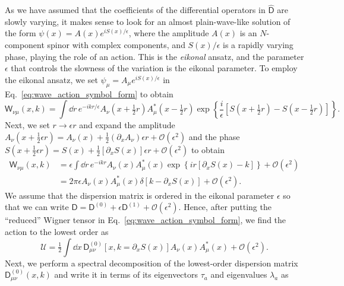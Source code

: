 As we have assumed that the coefficients of the differential operators in $\widehat{\mathsf{D}}$ are slowly varying, it makes sense to look for an almost plain-wave-like solution of the form
$\psi(x) = A(x)e^{iS(x)/\epsilon}$, where the amplitude $A(x)$ is an $N$-component spinor with complex components, and $S(x)/\epsilon$ is a rapidly varying phase, playing the role of an action.
This is the \emph{eikonal} ansatz, and the parameter $\epsilon$ that controls the slowness of the variation is the eikonal parameter.
To employ the eikonal ansatz, we set $\psi_{\mu} = A_{\mu}e^{iS(x)/\epsilon}$ in Eq.~\eqref{eq:wave_action_symbol_form} to obtain%
%
\begin{equation}
    \mathsf{W}_{\nu\mu}(x, k) = \int \dd{r}\,e^{-ikr/\epsilon} A_{\nu}\left(x + \tfrac{1}{2} r\right)A_{\mu}^{*}\left(x - \tfrac{1}{2} r\right)\exp\left\{\frac{i}{\epsilon}\left[S\left(x + \tfrac{1}{2} r\right) - S\left(x - \tfrac{1}{2} r\right)\right]\right\}.
\end{equation}
%
Next, we set $r \to \epsilon r$ and expand the amplitude $A_{\nu}(x + \tfrac{1}{2}\epsilon r) = A_{\nu}(x) + \tfrac{1}{2}(\partial_{x}A_{\nu})\epsilon r + \mathcal{O}(\epsilon^{2})$ and the phase $S(x + \tfrac{1}{2}\epsilon r) = S(x) + \tfrac{1}{2}[\partial_{x}S(x)]\epsilon r + \mathcal{O}(\epsilon^{2})$ to obtain
%
\begin{equation}
  \begin{aligned}
    \mathsf{W}_{\nu\mu}(x, k) &= \epsilon\int \dd{r}\,e^{-ikr} A_{\nu}(x)A_{\mu}^{*}(x)\exp\left\{ir\left[\partial_{x}S(x) - k\right]\right\} + \mathcal{O}(\epsilon^{2}) \\
                        &= 2\pi\epsilon A_{\nu}(x)A^{*}_{\mu}(x)\delta\left[k - \partial_{x}S(x)\right] + \mathcal{O}(\epsilon^{2}).
  \end{aligned}
\end{equation}
%
We assume that the dispersion matrix is ordered in the eikonal parameter $\epsilon$ so that we can write
$\mathsf{D} = \mathsf{D}^{(0)} + \epsilon \mathsf{D}^{(1)} + \mathcal{O}(\epsilon^{2})$.
Hence, after putting the ``reduced'' Wigner tensor in Eq.~\eqref{eq:wave_action_symbol_form}, we find the action to the lowest order as
%
\begin{equation}
  \mathscr{U} = \tfrac{1}{2}\int \dd{x}\, \mathsf{D}^{(0)}_{\mu\nu}\left[x, k=\partial_{x}S(x)\right]A_{\nu}(x)A^{*}_{\mu}(x) + \mathcal{O}(\epsilon^{2}).
  \label{eq:wave_action_reduced_1}
\end{equation}
%
Next, we perform a spectral decomposition of the lowest-order dispersion matrix $\mathsf{D}^{(0)}_{\mu\nu}(x, k)$ and write it in terms of its eigenvectors $\tau_{a}$ and eigenvalues $\lambda_{a}$ as%
